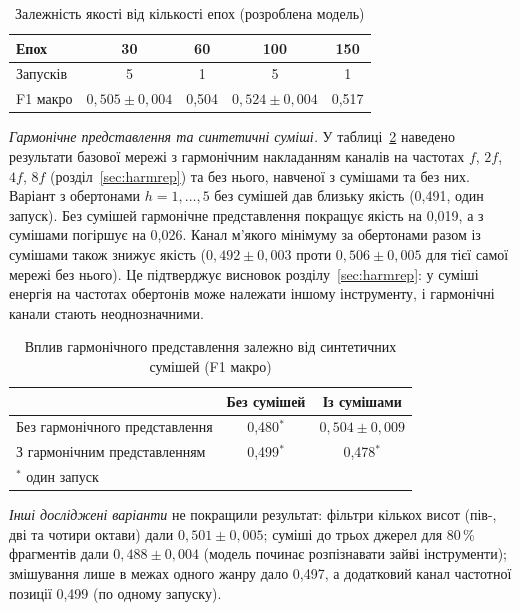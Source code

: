 \begin{table}[H]
\centering
\caption{Залежність якості від кількості епох (розроблена модель)}
\label{tab:epochs}
\begin{tabular}{|l|c|c|c|c|}
\hline
Епох & 30 & 60 & 100 & 150 \\
\hline
Запусків & 5 & 1 & 5 & 1 \\
F1 макро & $0{,}505 \pm 0{,}004$ & 0,504 & $0{,}524 \pm 0{,}004$ & 0,517 \\
\hline
\end{tabular}
\end{table}

\textit{Гармонічне представлення та синтетичні суміші.} У
таблиці~\ref{tab:harm} наведено результати базової мережі з гармонічним
накладанням каналів на частотах $f$, $2f$, $4f$, $8f$
(розділ~\ref{sec:harmrep}) та без нього, навченої з сумішами та без них.
Варіант з обертонами $h = 1, \ldots, 5$ без сумішей дав близьку якість
(0,491, один запуск). Без сумішей гармонічне представлення покращує якість
на 0,019, а з сумішами погіршує на 0,026. Канал м'якого мінімуму за
обертонами разом із сумішами також знижує якість ($0{,}492 \pm 0{,}003$
проти $0{,}506 \pm 0{,}005$ для тієї самої мережі без нього). Це
підтверджує висновок розділу~\ref{sec:harmrep}: у суміші енергія на
частотах обертонів може належати іншому інструменту, і гармонічні канали
стають неоднозначними.

\begin{table}[H]
\centering
\caption{Вплив гармонічного представлення залежно від синтетичних сумішей (F1 макро)}
\label{tab:harm}
\begin{tabular}{|l|c|c|}
\hline
 & Без сумішей & Із сумішами \\
\hline
Без гармонічного представлення & 0,480$^{*}$ & $0{,}504 \pm 0{,}009$ \\
З гармонічним представленням   & 0,499$^{*}$ & 0,478$^{*}$ \\
\hline
\multicolumn{3}{|l|}{\small $^{*}$ один запуск} \\
\hline
\end{tabular}
\end{table}

\textit{Інші досліджені варіанти} не покращили результат: фільтри кількох
висот (пів-, дві та чотири октави) дали $0{,}501 \pm 0{,}005$; суміші до
трьох джерел для 80\,\% фрагментів дали $0{,}488 \pm 0{,}004$ (модель
починає розпізнавати зайві інструменти); змішування лише в межах одного
жанру дало 0,497, а додатковий канал частотної позиції 0,499 (по одному
запуску).

